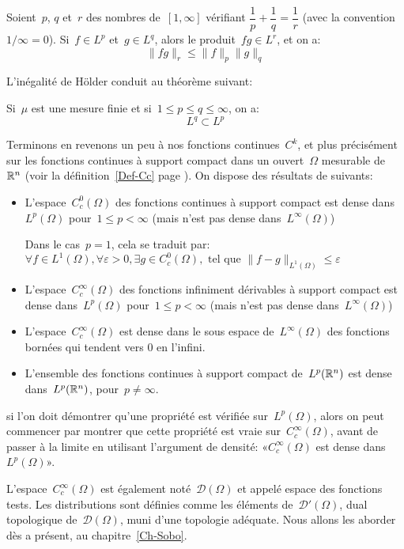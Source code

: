 \begin{theoreme}
Soient~$p$, $q$ et~$r$ des nombres de~$[1,\infty]$ vérifiant
$\dfrac1p+\dfrac1q=\dfrac1r$ (avec la convention~$1/\infty=0$).
Si~$f\in L^p$ et~$g\in L^q$, alors le produit~$fg\in L^r$, et on a:
\begin{equation}\|fg\|_r\le\|f\|_p\|g\|_q\end{equation}
\end{theoreme}

L'inégalité de Hölder conduit au théorème suivant:
\begin{theoreme}
Si~$\mu$ est une mesure finie et si~$1\le p\le q\le \infty$, on a:
\begin{equation}L^q\subset L^p\end{equation}
\end{theoreme}

\medskip
Terminons en revenons un peu à nos fonctions continues~$C^k$, et plus précisément sur les fonctions continues à support compact
dans un ouvert~$\Omega$ mesurable de~$\mathbb R^n$ (voir la définition~\ref{Def-Cc} page \pageref{Def-Cc}).
On dispose des résultats de  suivants:
\begin{itemize}
  \item L'espace~$C_c^0(\Omega)$ des fonctions continues à support compact est dense dans~$L^p(\Omega)$ pour~$1\le p<\infty$
	(mais n'est pas dense dans~$L^\infty(\Omega)$)

	 Dans le cas~$p=1$, cela se traduit par: 	$ \forall f\in L^1(\Omega), \forall\varepsilon>0, \exists g\in C_ c^0(\Omega), \text{ tel que }
	  \|f-g\|_{L^1(\Omega)}\le\varepsilon$ 

  \item L'espace~$C_c^\infty(\Omega)$ des fonctions infiniment dérivables à support compact est dense dans~$L^p(\Omega)$ pour~$1\le p<\infty$
	(mais n'est pas dense dans~$L^\infty(\Omega)$)
  \item L'espace~$C_c^\infty(\Omega)$ est dense dans le sous espace de~$L^\infty(\Omega)$ des fonctions bornées qui tendent vers 0 en l'infini.
  \item L'ensemble des fonctions continues à support compact de~$L^p(\mathbb R^n)$ est dense dans~$L^p(\mathbb R^n)$, pour~$ p\neq \infty$. 
\end{itemize}

si l'on doit démontrer qu'une propriété est vérifiée sur~$L^p(\Omega)$, alors on peut commencer par montrer que cette propriété est 
vraie sur~$C_c^\infty(\Omega)$, avant de passer à la limite en utilisant l'argument de densité:
«$C_c^\infty(\Omega)$ est dense dans~$L^p(\Omega)$».

\medskip
L'espace~$C_c^{\infty}(\Omega)$ est également noté~$\mathcal{D}(\Omega)$ et appelé espace des fonctions tests. 
Les distributions sont définies comme les éléments de~$\mathcal{D}'(\Omega)$, dual topologique de~$\mathcal{D}(\Omega)$, 
muni d'une topologie adéquate.
Nous allons les aborder dès a présent, au chapitre~\ref{Ch-Sobo}.
